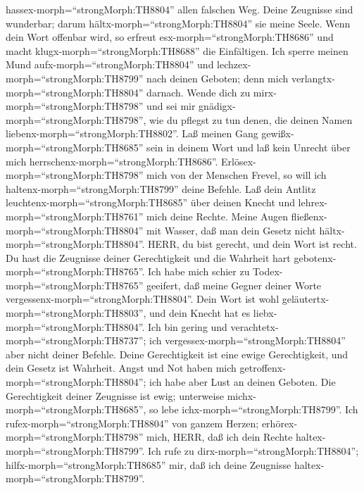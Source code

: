 hassex-morph=``strongMorph:TH8804'' allen falschen Weg. 
Deine Zeugnisse sind wunderbar; darum hältx-morph=``strongMorph:TH8804''
sie meine Seele.  Wenn dein Wort offenbar wird, so erfreut
esx-morph=``strongMorph:TH8686'' und macht
klugx-morph=``strongMorph:TH8688'' die Einfältigen.  Ich
sperre meinen Mund aufx-morph=``strongMorph:TH8804'' und
lechzex-morph=``strongMorph:TH8799'' nach deinen Geboten; denn mich
verlangtx-morph=``strongMorph:TH8804'' darnach.  Wende
dich zu mirx-morph=``strongMorph:TH8798'' und sei mir
gnädigx-morph=``strongMorph:TH8798'', wie du pflegst zu tun denen, die
deinen Namen liebenx-morph=``strongMorph:TH8802''.  Laß
meinen Gang gewißx-morph=``strongMorph:TH8685'' sein in deinem Wort und
laß kein Unrecht über mich herrschenx-morph=``strongMorph:TH8686''.
 Erlösex-morph=``strongMorph:TH8798'' mich von der
Menschen Frevel, so will ich haltenx-morph=``strongMorph:TH8799'' deine
Befehle.  Laß dein Antlitz
leuchtenx-morph=``strongMorph:TH8685'' über deinen Knecht und
lehrex-morph=``strongMorph:TH8761'' mich deine Rechte. 
Meine Augen fließenx-morph=``strongMorph:TH8804'' mit Wasser, daß man
dein Gesetz nicht hältx-morph=``strongMorph:TH8804''. 
HERR, du bist gerecht, und dein Wort ist recht.  Du hast
die Zeugnisse deiner Gerechtigkeit und die Wahrheit hart
gebotenx-morph=``strongMorph:TH8765''.  Ich habe mich
schier zu Todex-morph=``strongMorph:TH8765'' geeifert, daß meine Gegner
deiner Worte vergessenx-morph=``strongMorph:TH8804''. 
Dein Wort ist wohl geläutertx-morph=``strongMorph:TH8803'', und dein
Knecht hat es liebx-morph=``strongMorph:TH8804''.  Ich bin
gering und verachtetx-morph=``strongMorph:TH8737''; ich
vergessex-morph=``strongMorph:TH8804'' aber nicht deiner Befehle.
 Deine Gerechtigkeit ist eine ewige Gerechtigkeit, und
dein Gesetz ist Wahrheit.  Angst und Not haben mich
getroffenx-morph=``strongMorph:TH8804''; ich habe aber Lust an deinen
Geboten.  Die Gerechtigkeit deiner Zeugnisse ist ewig;
unterweise michx-morph=``strongMorph:TH8685'', so lebe
ichx-morph=``strongMorph:TH8799''.  Ich
rufex-morph=``strongMorph:TH8804'' von ganzem Herzen;
erhörex-morph=``strongMorph:TH8798'' mich, HERR, daß ich dein Rechte
haltex-morph=``strongMorph:TH8799''.  Ich rufe zu
dirx-morph=``strongMorph:TH8804''; hilfx-morph=``strongMorph:TH8685''
mir, daß ich deine Zeugnisse haltex-morph=``strongMorph:TH8799''.
